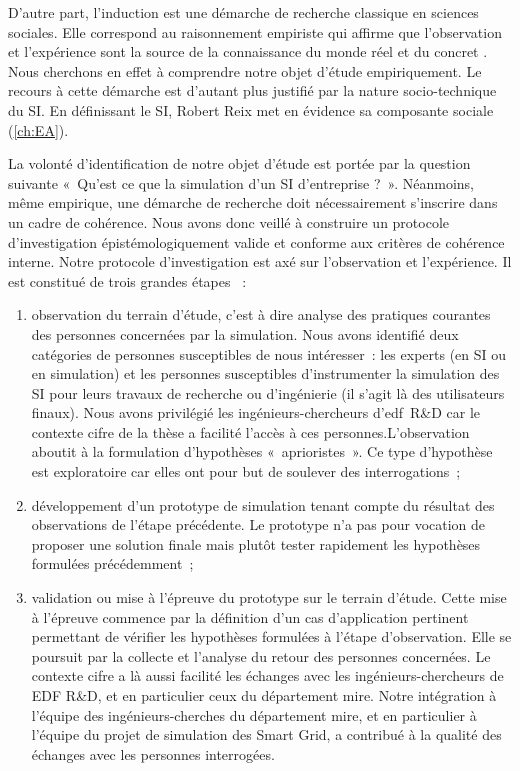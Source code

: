 {	D'autre part, l'induction est une démarche de recherche classique en sciences 
sociales. Elle correspond au raisonnement empiriste qui affirme que 
l'observation et l'expérience sont la source de la connaissance du monde réel et 
du concret \cite{madeleine2001methodes}. Nous cherchons en effet à comprendre 
notre objet d'étude empiriquement. Le recours à cette démarche est d'autant plus 
justifié par la nature socio-technique du SI. En définissant le SI, Robert Reix 
met en évidence sa composante sociale (\ref{ch:EA}). 
	

	La volonté d'identification de notre objet d'étude est portée par la question 
suivante «~Qu'est ce que la simulation d'un SI d'entreprise ?~». Néanmoins, même 
empirique, une démarche de recherche doit nécessairement s'inscrire dans un 
cadre de cohérence. Nous avons donc veillé à construire un protocole 
d'investigation épistémologiquement valide et conforme aux critères de cohérence 
interne. Notre protocole d'investigation est axé sur l'observation et 
l'expérience. Il est constitué de trois grandes étapes ~:
		
		\begin{enumerate}
		
	\item observation du terrain d'étude, c'est à dire analyse des pratiques 
courantes des personnes concernées par la simulation. Nous avons identifié deux 
catégories de personnes susceptibles de nous intéresser~: les experts (en SI ou 
en simulation) et les personnes susceptibles d'instrumenter la simulation des SI 
pour leurs travaux de recherche ou d'ingénierie (il s'agit là des utilisateurs 
finaux). Nous avons privilégié les ingénieurs-chercheurs d'\gls{edf}~R\&D car le 
contexte \gls{cifre} de la thèse a facilité l'accès à ces 
personnes.L'observation aboutit à la formulation d'hypothèses «~aprioristes~». 
Ce type d'hypothèse est exploratoire car elles ont pour but de soulever des 
interrogations~;
	
	\item développement d'un prototype de simulation tenant compte du résultat des 
observations de l'étape précédente. Le prototype n'a pas pour vocation de 
proposer une solution finale mais plutôt tester rapidement les hypothèses 
formulées précédemment~;
	
	\item validation ou mise à l'épreuve du prototype sur le terrain d'étude. Cette 
mise à l'épreuve commence par la définition d'un cas d'application pertinent 
permettant de vérifier les hypothèses formulées à l'étape d'observation. Elle se 
poursuit par la collecte et l'analyse du retour des personnes concernées. Le 
contexte \gls{cifre} a là aussi facilité les échanges avec les 
ingénieurs-chercheurs de EDF R&D, et en particulier ceux du département 
\gls{mire}. Notre intégration à l'équipe des ingénieurs-cherches du département 
\gls{mire}, et en particulier à l'équipe du projet de simulation des Smart Grid, 
a contribué à la qualité des échanges avec les personnes interrogées.
	

\end{enumerate}}
